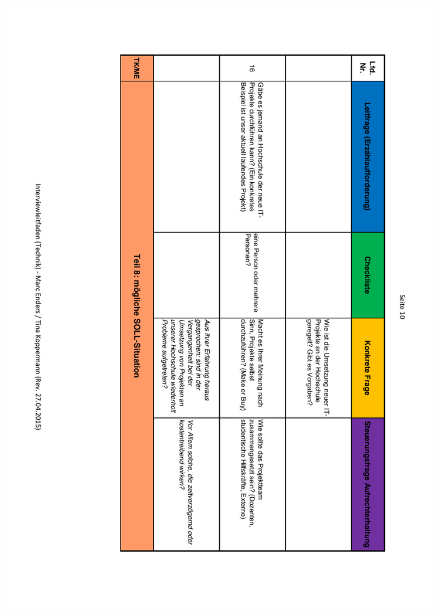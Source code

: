 \begin{figure}
	\centering
	\includegraphics[width=18cm]{kapitel/anhang/Interviewleitfaden_10}
\end{figure}

